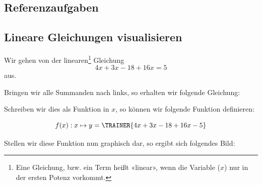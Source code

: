 
\newpage


\subsection{Referenzaufgaben}



\newpage


\newpage


\newpage

\TALS{
\newpage}


\subsection{Lineare Gleichungen visualisieren}
Wir gehen von der linearen\footnote{Eine Gleichung, bzw. ein Term
  heißt «linear», wenn die Variable ($x$) nur in der ersten Potenz vorkommt.} Gleichung $$4x+3x -18 + 16x = 5$$ aus.

Bringen wir alle Summanden nach links, so erhalten wir folgende
Gleichung:



Schreiben wir dies als Funktion in $x$, so können wir folgende
Funktion definieren:

$$f(x): x \mapsto y = \TRAINER{4x+3x-18+16x - 5}$$

Stellen wir diese Funktion nun graphisch dar, so ergibt sich folgendes
Bild:



